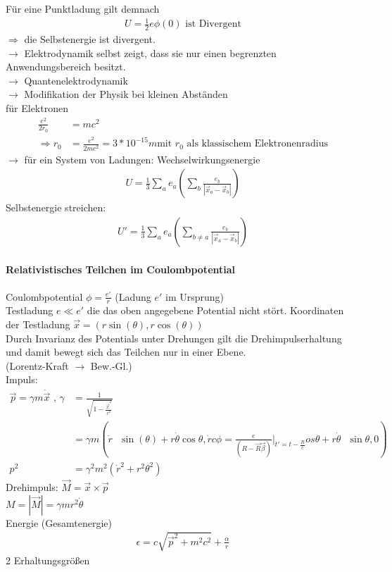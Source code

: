 \documentclass[a4paper]{article}
\begin{document}
Für eine Punktladung gilt demnach
\begin{align}
U=\frac{1}{2}e\phi(0) \text{ ist Divergent}
\end{align}
$\Rightarrow$ die Selbstenergie ist divergent.\\
$\rightarrow$ Elektrodynamik selbst zeigt, dass sie nur einen begrenzten
Anwendungsbereich besitzt.\\
$\rightarrow$ Quantenelektrodynamik\\
$\rightarrow$ Modifikation der Physik bei kleinen Abständen\\
für Elektronen\\
\begin{align}
\frac{e^2}{2r_0}&=mc^2 \\
\Rightarrow r_0&=\frac{e^2}{2mc^2}=3*10^{-15}m \text{
mit }r_0\text{ als klassischem Elektronenradius}
\end{align}
$\rightarrow$ für ein System von Ladungen: Wechselwirkungsenergie
\begin{align}
U=\frac{1}{3}\sum_a e_a \left(\sum_{b} \frac{e_b}{|\vec{x}_a-\vec{x}_b|} \right)
\end{align}
Selbstenergie streichen:
\begin{align}
U'=\frac{1}{3}\sum_a e_a \left(\sum_{b\neq a} \frac{e_b}{|\vec{x}_a-\vec{x}_b|}
\right)
\end{align}
\paragraph{Relativistisches Teilchen im Coulombpotential}
Coulombpotential $\phi=\frac{e'}{r}$ (Ladung $e'$ im Ursprung)\\
Testladung $e \ll e'$ die das oben angegebene Potential nicht stört.
Koordinaten der Testladung $\vec{x}=(r \sin(\theta), r \cos(\theta))$\\
Durch Invarianz des Potentials unter Drehungen gilt die Drehimpulserhaltung
und damit bewegt sich das Teilchen nur in einer Ebene.\\
(Lorentz-Kraft $\rightarrow$ Bew.-Gl.)\\
Impuls: 
\begin{align}
\vec{p}=\gamma m \dot{\vec{x}} \text{ , }
\gamma&=\frac{1}{\sqrt{1-\frac{\dot{\vec{x}}^2}{c^2}}}\\
&=\gamma m \left(\dot{r}\text{ }\sin(\theta)+r \dot{\theta} \text{
}\cos\theta,\dot{r} \text{
}c\phi=\frac{e}{(R-\vec{R}\vec{\beta})}|_{t'=t-\frac{R}{c}}os\theta+r\dot{\theta} \text{ }\sin\theta,0\right)\\
p^2&=\gamma^2m^2(\dot{r}^2+r^2 \theta^2)
\end{align}
Drehimpuls: $\vec{M}=\vec{x}\times\vec{p}$\\
$M=|\vec{M}|=\gamma mr^2\dot{\theta}$\\
Energie (Gesamtenergie)
\begin{align}
\epsilon=c\sqrt{\vec{p}^2+m^2c^2}+\frac{\alpha}{r}
\end{align}
2 Erhaltungsgrößen
\end{document}
